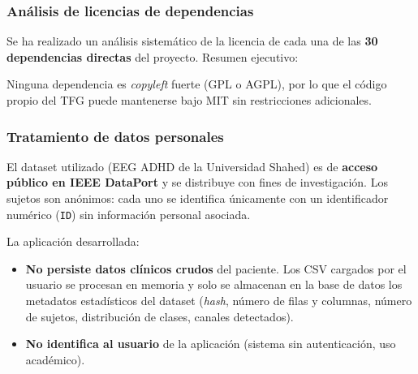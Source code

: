 \subsubsection{Análisis de licencias de dependencias}

Se ha realizado un análisis sistemático de la licencia de cada una de las \textbf{30 dependencias directas} del proyecto. Resumen ejecutivo:


Ninguna dependencia es \emph{copyleft} fuerte (GPL o AGPL), por lo que el código propio del TFG puede mantenerse bajo MIT sin restricciones adicionales.

\subsubsection{Tratamiento de datos personales}

El dataset utilizado (EEG ADHD de la Universidad Shahed) es de \textbf{acceso público en IEEE DataPort} y se distribuye con fines de investigación. Los sujetos son anónimos: cada uno se identifica únicamente con un identificador numérico (\texttt{ID}) sin información personal asociada.

La aplicación desarrollada:

\begin{itemize}
    \item \textbf{No persiste datos clínicos crudos} del paciente. Los CSV cargados por el usuario se procesan en memoria y solo se almacenan en la base de datos los metadatos estadísticos del dataset (\emph{hash}, número de filas y columnas, número de sujetos, distribución de clases, canales detectados).
    \item \textbf{No identifica al usuario} de la aplicación (sistema sin autenticación, uso académico).
\end{itemize}

